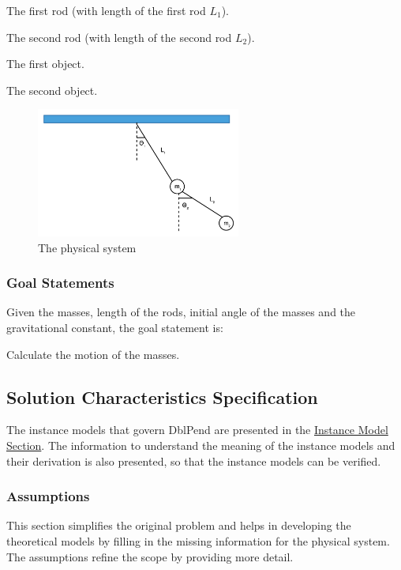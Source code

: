 \documentclass[12pt]{article}
\begin{document}
{\begin{description}[font=\normalfont]
\item[PS1:]{The first rod (with length of the first rod ${L_{1}}$).}
\item[PS2:]{The second rod (with length of the second rod ${L_{2}}$).}
\item[PS3:]{The first object.}
\item[PS4:]{The second object.}
\end{description}
\begin{figure}[H]
\begin{center}
\includegraphics[width=0.6\textwidth]{../../../../datafiles/dblpend/dblpend.png}
\caption{The physical system}
\label{Figure:dblpend}
\end{center}
\end{figure}
\subsubsection{Goal Statements}
\label{Sec:GoalStmt}
Given the masses, length of the rods, initial angle of the masses and the gravitational constant, the goal statement is:

\begin{description}[font=\normalfont]
\item[motionMass:\phantomsection\label{motionMass}]{Calculate the motion of the masses.}
\end{description}
\subsection{Solution Characteristics Specification}
\label{Sec:SolCharSpec}
The instance models that govern DblPend are presented in the \hyperref[Sec:IMs]{Instance Model Section}. The information to understand the meaning of the instance models and their derivation is also presented, so that the instance models can be verified.

\subsubsection{Assumptions}
\label{Sec:Assumps}
This section simplifies the original problem and helps in developing the theoretical models by filling in the missing information for the physical system. The assumptions refine the scope by providing more detail.

}
\end{document}
